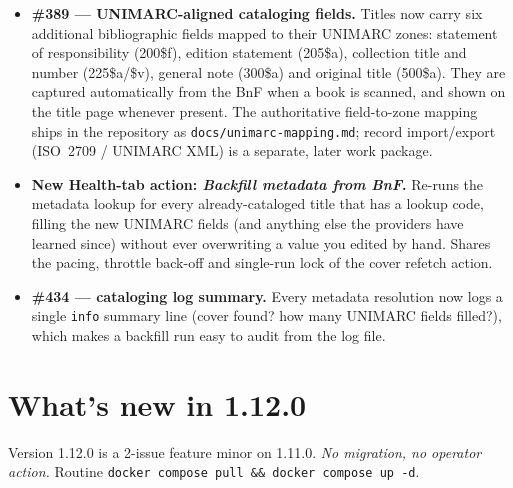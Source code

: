 \begin{itemize}
  \item \textbf{\#389 \string— UNIMARC-aligned cataloging fields.}
        Titles now carry six additional bibliographic fields mapped
        to their UNIMARC zones: statement of responsibility
        (200\$f), edition statement (205\$a), collection title and
        number (225\$a/\$v), general note (300\$a) and original
        title (500\$a). They are captured automatically from the
        BnF when a book is scanned, and shown on the title page
        whenever present. The authoritative field-to-zone mapping
        ships in the repository as
        \texttt{docs/unimarc-mapping.md}; record import/export
        (ISO~2709 / UNIMARC XML) is a separate, later work package.
  \item \textbf{New Health-tab action: \emph{Backfill metadata from
        BnF}.} Re-runs the metadata lookup for every already-cataloged
        title that has a lookup code, filling the new UNIMARC fields
        (and anything else the providers have learned since) without
        ever overwriting a value you edited by hand. Shares the
        pacing, throttle back-off and single-run lock of the cover
        refetch action.
  \item \textbf{\#434 \string— cataloging log summary.} Every
        metadata resolution now logs a single \texttt{info} summary
        line (cover found? how many UNIMARC fields filled?), which
        makes a backfill run easy to audit from the log file.
\end{itemize}

\section{What's new in 1.12.0}\label{sec:whats-new-1.12.0}

Version 1.12.0 is a 2-issue feature minor on 1.11.0. \emph{No
migration, no operator action.} Routine \texttt{docker compose pull
\&\& docker compose up -d}.

